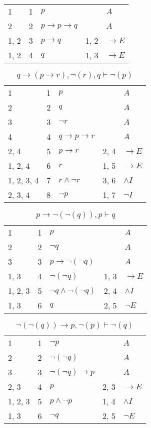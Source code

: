 \documentclass{article}
\begin{document}
\begin{table}[htbp]
\begin{tabular}{lrlll}
{1} & 1 & $p$ & {} & $A$ \\
{2} & 2 & $p→p→q$ & {} & $A$ \\
{1, 2} & 3 & $p→q$ & {1, 2} & $→E$ \\
{1, 2} & 4 & $q$ & {1, 3} & $→E$ \\
\end{tabular}
\end{table}\begin{table}[htbp]\caption*{$q → (p → r),¬(r),q ⊢ ¬(p)$}\centering\begin{tabular}{lrlll}
{1} & 1 & $p$ & {} & $A$ \\
{2} & 2 & $q$ & {} & $A$ \\
{3} & 3 & $¬r$ & {} & $A$ \\
{4} & 4 & $q→p→r$ & {} & $A$ \\
{2, 4} & 5 & $p→r$ & {2, 4} & $→E$ \\
{1, 2, 4} & 6 & $r$ & {1, 5} & $→E$ \\
{1, 2, 3, 4} & 7 & $r∧ ¬r$ & {3, 6} & $∧I$ \\
{2, 3, 4} & 8 & $¬p$ & {1, 7} & $¬I$ \\
\end{tabular}
\end{table}\begin{table}[htbp]\caption*{$p → ¬(¬(q)),p ⊢ q$}\centering\begin{tabular}{lrlll}
{1} & 1 & $p$ & {} & $A$ \\
{2} & 2 & $¬q$ & {} & $A$ \\
{3} & 3 & $p→ ¬ (¬q)$ & {} & $A$ \\
{1, 3} & 4 & $¬ (¬q)$ & {1, 3} & $→E$ \\
{1, 2, 3} & 5 & $¬q∧ ¬ (¬q)$ & {2, 4} & $∧I$ \\
{1, 3} & 6 & $q$ & {2, 5} & $¬E$ \\
\end{tabular}
\end{table}\begin{table}[htbp]\caption*{$¬(¬(q)) → p,¬(p) ⊢ ¬(q)$}\centering\begin{tabular}{lrlll}
{1} & 1 & $¬p$ & {} & $A$ \\
{2} & 2 & $¬ (¬q)$ & {} & $A$ \\
{3} & 3 & $¬ (¬q)→p$ & {} & $A$ \\
{2, 3} & 4 & $p$ & {2, 3} & $→E$ \\
{1, 2, 3} & 5 & $p∧ ¬p$ & {1, 4} & $∧I$ \\
{1, 3} & 6 & $¬q$ & {2, 5} & $¬E$ \\

\end{tabular}
\end{table}
\end{document}
